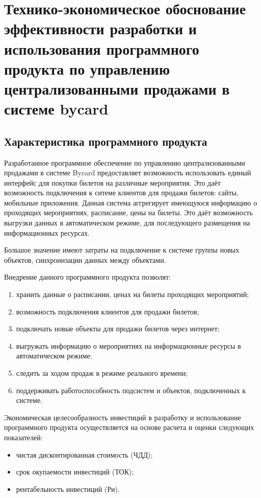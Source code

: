 \section{Технико-экономическое обоснование эффективности разработки и использования программного продукта по управлению централизованными продажами в системе bycard}

\subsection{Характеристика программного продукта}
Разработанное программное обеспечение по управлению централизованными продажами в системе Bycard предоставляет возможность использовать единый интерфейс для покупки билетов на различные мероприятия. Это даёт возможность подключения к ситеме клиентов для продажи билетов: сайты, мобильные приложения. Данная система аггрегирует имеющуюся информацию о проходящих мероприятиях, расписание, цены на билеты. Это даёт возможность выгрузки данных в автоматическом режиме, для последующего размещения на информационных ресурсах.

Большое значение имеют затраты на подключение к системе группы новых объектов, синхронизации данных между объектами.

Внедрение данного программного продукта позволят:
\begin{enumerate}
    \item хранить данные о расписании, ценах на билеты проходящих мероприятий;
    \item возможность подключения клиентов для продажи билетов;
    \item подключать новые объекты для продажи билетов через интернет;
    \item выгружать информацию о мероприятиях на информационные ресурсы в автоматическом режиме;
    \item следить за ходом продаж в режиме реального времени;
    \item поддерживать работоспособность подсистем и объектов, подключенных к системе.
\end{enumerate}

Экономическая целесообразность инвестиций в разработку и использование программного продукта осуществляется на основе расчета и оценки следующих показателей:
\begin{itemize}
    \item чистая  дисконтированная стоимость (ЧДД);
    \item срок окупаемости инвестиций (ТОК);
    \item рентабельность инвестиций (Ри).
\end{itemize}

